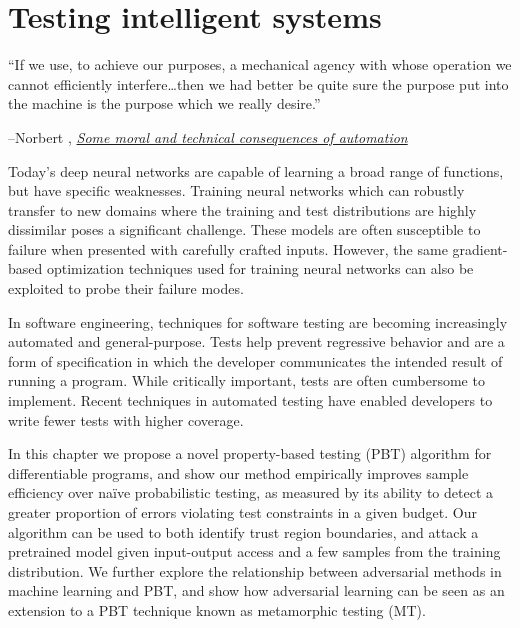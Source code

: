 \chapter{Testing intelligent systems}\label{ch:difftest}

\setlength{\epigraphwidth}{0.80\textwidth}
\epigraph{``If we use, to achieve our purposes, a mechanical agency with whose operation we cannot efficiently interfere\ldots then we had better be quite sure the purpose put into the machine is the purpose which we really desire.''}{\begin{flushright}--Norbert \citet{wiener1960some}, \href{https://www.ias.ac.in/article/fulltext/reso/004/01/0080-0088}{\textit{Some moral and technical consequences of automation}}~\end{flushright}}

Today's deep neural networks are capable of learning a broad range of functions, but have specific weaknesses. Training neural networks which can robustly transfer to new domains where the training and test distributions are highly dissimilar poses a significant challenge. These models are often susceptible to failure when presented with carefully crafted inputs. However, the same gradient-based optimization techniques used for training neural networks can also be exploited to probe their failure modes.

In software engineering, techniques for software testing are becoming increasingly automated and general-purpose. Tests help prevent regressive behavior and are a form of specification in which the developer communicates the intended result of running a program. While critically important, tests are often cumbersome to implement. Recent techniques in automated testing have enabled developers to write fewer tests with higher coverage.

In this chapter we propose a novel property-based testing (PBT) algorithm for differentiable programs, and show our method empirically improves sample efficiency over na\"ive probabilistic testing, as measured by its ability to detect a greater proportion of errors violating test constraints in a given budget. Our algorithm can be used to both identify trust region boundaries, and attack a pretrained model given input-output access and a few samples from the training distribution. We further explore the relationship between adversarial methods in machine learning and PBT, and show how adversarial learning can be seen as an extension to a PBT technique known as metamorphic testing (MT).

